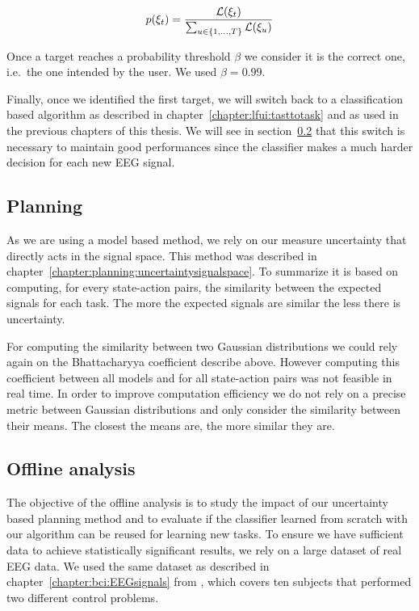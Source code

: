 \begin{eqnarray}
p(\xi_t) = \frac{\mathcal{L}(\xi_t)}{\sum_{u \in \{1, \ldots, T\}} \mathcal{L}(\xi_u)}
\end{eqnarray}

Once a target reaches a probability threshold $\beta$ we consider it is the correct one, i.e.\ the one intended by the user. We used $\beta = 0.99$.

Finally, once we identified the first target, we will switch back to a classification based algorithm as described in chapter~\ref{chapter:lfui:tasttotask} and as used in the previous chapters of this thesis. We will see in section~\ref{chapter:limitations:overlap:offline} that this switch is necessary to maintain good performances since the classifier makes a much harder decision for each new EEG signal.

\subsection{Planning}

As we are using a model based method, we rely on our measure uncertainty that directly acts in the signal space. This method was described in chapter~\ref{chapter:planning:uncertaintysignalspace}. To summarize it is based on computing, for every state-action pairs, the similarity between the expected signals for each task. The more the expected signals are similar the less there is uncertainty.

For computing the similarity between two Gaussian distributions we could rely again on the Bhattacharyya coefficient describe above. However computing this coefficient between all models and for all state-action pairs was not feasible in real time. In order to improve computation efficiency we do not rely on a precise metric between Gaussian distributions and only consider the similarity between their means. The closest the means are, the more similar they are.

\subsection{Offline analysis}
\label{chapter:limitations:overlap:offline}

The objective of the offline analysis is to study the impact of our uncertainty based planning method and to evaluate if the classifier learned from scratch with our algorithm can be reused for learning new tasks. To ensure we have sufficient data to achieve statistically significant results, we rely on a large dataset of real EEG data. We used the same dataset as described in chapter~\ref{chapter:bci:EEGsignals} from \cite{iturrate2013task}, which covers ten subjects that performed two different control problems.

